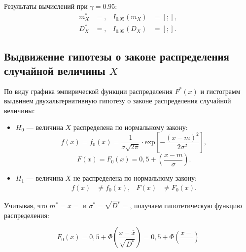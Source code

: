\documentclass[14pt,hidelinks]{extarticle}
\begin{document}
Результаты вычислений при $ \gamma = 0.95 $:
\begin{equation*}
	\begin{aligned}
		m^*_X &= , &
		I_{0.95}(m_X) &= \left[ ;  \right], \\
		D^*_X &= , &
                I_{0.95}(D_X) &= \left[ ;  \right].
	\end{aligned}
\end{equation*}

\newpage

\subsection{Выдвижение гипотезы о законе распределения случайной величины $ X $}
По виду графика эмпирической функции распределения $F^*(x)$ и гистограмм выдвинем двухальтернативную
гипотезу о законе распределения случайной величины:

\begin{itemize}
	\item $H_0$ --- величина $X$ распределена по нормальному закону:
	\begin{equation}
          f(x) = f_0(x) = \frac{1}{\sigma\sqrt{2\pi}} \cdot \text{exp} \left[-\frac{(x-m)^2}{2\sigma^2} \right],
	\end{equation}
        \begin{equation}
          F(x) = F_0(x) = 0,5 + \left( \frac{x-m}{\sigma} \right).
        \end{equation}
          
	\item $H_1$ --- величина $X$ не распределена по нормальному закону:
          \begin{align}
		f(x) & \neq f_0(x) ,&
		F(x) & \neq F_0(x).
	\end{align}
\end{itemize}

Учитывая, что $m^* = \overline{x} = $ и $\sigma^* = \sqrt{D^*} = $, получаем гипотетическую функцию распределения:

\begin{equation*}
  F_0(x) = 0,5 + \Phi \left( \frac{x-\overline{x}}{\sqrt{D^*}} \right) =
  0,5 + \Phi \left( \frac{x- }{} \right)
\end{equation*}
\end{document}
